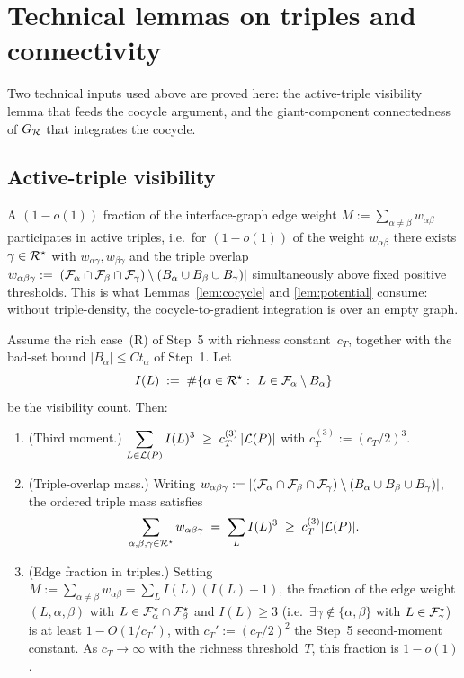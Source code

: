 \section{Technical lemmas on triples and connectivity}

Two technical inputs used above are proved here: the active-triple
visibility lemma that feeds the cocycle argument, and the
giant-component connectedness of $G_{\mathcal{R}}$ that integrates the
cocycle.

\subsection{Active-triple visibility}\label{sec:gap-triples}

A $(1-o(1))$ fraction of the interface-graph edge weight
$M:=\sum_{\alpha\ne\beta}w_{\alpha\beta}$ participates in active
triples, i.e.\ for $(1-o(1))$ of the weight
$w_{\alpha\beta}$ there exists $\gamma\in\mathcal{R}^\star$ with
$w_{\alpha\gamma},w_{\beta\gamma}$ and the triple overlap
$w_{\alpha\beta\gamma}:=|(\mathcal{F}_{\alpha}\cap\mathcal{F}_{\beta}\cap\mathcal{F}_{\gamma})
\setminus(B_\alpha\cup B_\beta\cup B_\gamma)|$ simultaneously above
fixed positive thresholds.  This is what Lemmas~\ref{lem:cocycle} and
\ref{lem:potential} consume: without triple-density, the
cocycle-to-gradient integration is over an empty graph.

\begin{lemma}\label{lem:triple-visibility}
Assume the rich case~(R) of Step~5 with richness constant~$c_T$,
together with the bad-set bound $|B_\alpha|\le Ct_\alpha$ of
Step~1.  Let
\[
  I(L) \;:=\; \#\{\alpha\in\mathcal{R}^\star:\ L\in\mathcal{F}_{\alpha}\setminus B_\alpha\}
\]
be the visibility count.  Then:
\begin{enumerate}[label=(\alph*),nosep]
  \item (Third moment.)  $\displaystyle \sum_{L\in\mathcal{L}(P)}I(L)^3
     \;\ge\; c_T^{(3)}\,|\mathcal{L}(P)|$ with $c_T^{(3)}:=(c_T/2)^3$.
  \item (Triple-overlap mass.)  Writing
    $w_{\alpha\beta\gamma}:=|(\mathcal{F}_{\alpha}\cap\mathcal{F}_{\beta}\cap
    \mathcal{F}_{\gamma})\setminus(B_\alpha\cup B_\beta\cup B_\gamma)|$,
    the ordered triple mass satisfies
    \[
      \sum_{\alpha,\beta,\gamma\in\mathcal{R}^\star}w_{\alpha\beta\gamma}
      \;=\; \sum_{L}I(L)^3
      \;\ge\; c_T^{(3)}|\mathcal{L}(P)|.
    \]
  \item (Edge fraction in triples.)  Setting
    $M:=\sum_{\alpha\ne\beta}w_{\alpha\beta}=\sum_L I(L)(I(L){-}1)$,
    the fraction of the edge weight $(L,\alpha,\beta)$ with
    $L\in\mathcal{F}_{\alpha}^\star\cap\mathcal{F}_{\beta}^\star$ and
    $I(L)\ge 3$ (i.e.\ $\exists\gamma\notin\{\alpha,\beta\}$ with
    $L\in\mathcal{F}_{\gamma}^\star$) is at least
    $1-O(1/c_T')$, with $c_T':=(c_T/2)^2$ the Step~5 second-moment
    constant.  As $c_T\to\infty$ with the richness threshold~$T$,
    this fraction is $1-o(1)$.
\end{enumerate}
\end{lemma}

